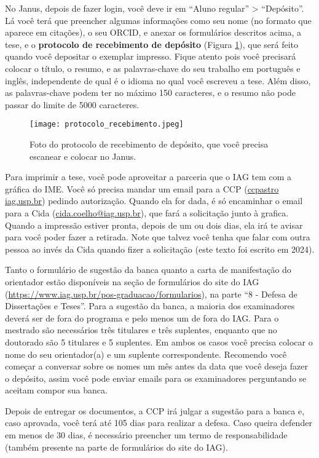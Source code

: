     No Janus, depois de fazer login, você deve ir em ``Aluno regular'' > ``Depósito''. Lá você terá que preencher algumas informações como seu nome (no formato que aparece em citações), o seu ORCID, e anexar os formulários descritos acima, a tese, e o \textbf{protocolo de recebimento de depósito} (Figura \ref{fig:protocolo}), que será feito quando você depositar o exemplar impresso. Fique atento pois você precisará colocar o título, o resumo, e as palavras-chave do seu trabalho em português e inglês, independente de qual é o idioma no qual você escreveu a tese. Além disso, as palavras-chave podem ter no máximo 150 caracteres, e o resumo não pode passar do limite de 5000 caracteres.
    \begin{figure}[h]
      \centering
      \texttt{[image: protocolo\_recebimento.jpeg]}
      \caption{Foto do protocolo de recebimento de depósito, que você precisa escanear e colocar no Janus.}
      \label{fig:protocolo}
    \end{figure}

    Para imprimir a tese, você pode aproveitar a parceria que o IAG tem com a gráfica do IME. Você só precisa mandar um email para a CCP (\url{ccpastro iag.usp.br}) pedindo autorização. Quando ela for dada, é só encaminhar o email para a Cida (\url{cida.coelho@iag.usp.br}), que fará a solicitação junto à grafica. Quando a impressão estiver pronta, depois de um ou dois dias, ela irá te avisar para você poder fazer a retirada. Note que talvez você tenha que falar com outra pessoa ao invés da Cida quando fizer a solicitação (este texto foi escrito em 2024).

    Tanto o formulário de sugestão da banca quanto a carta de manifestação do orientador estão disponíveis na seção de formulários do site do IAG (\url{https://www.iag.usp.br/pos-graduacao/formularios}), na parte ``8 - Defesa de Dissertações e Teses''. Para a sugestão da banca, a maioria dos examinadores deverá ser de fora do programa e pelo menos um de fora do IAG. Para o mestrado são necessários três titulares e três suplentes, enquanto que no doutorado são 5 titulares e 5 suplentes. Em ambos os casos você precisa colocar o nome do seu orientador(a) e um suplente correspondente. Recomendo você começar a conversar sobre os nomes um mês antes da data que você deseja fazer o depósito, assim você pode enviar emails para os examinadores perguntando se aceitam compor sua banca.

    Depois de entregar os documentos, a CCP irá julgar a sugestão para a banca e, caso aprovada, você terá até 105 dias para realizar a defesa. Caso queira defender em menos de 30 dias, é necessário preencher um termo de responsabilidade (também presente na parte de formulários do site do IAG).

